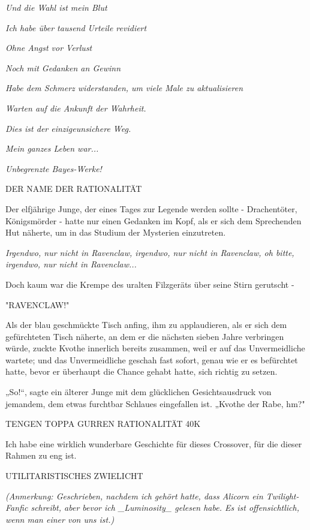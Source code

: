 {\emph{\emph{Und} \emph{die} \emph{Wahl ist mein Blut}}

\emph{\emph{Ich habe über tausend Urteile revidiert}}

\emph{\emph{Ohne Angst vor Verlust}}

\emph{\emph{Noch} \emph{mit Gedanken an} \emph{Gewinn}}

\emph{\emph{Habe dem Schmerz widerstanden, um viele Male zu aktualisieren}}

\emph{\emph{Warten auf die Ankunft der Wahrheit.}}

\emph{\emph{Dies ist der einzigeunsichere Weg.}}

\emph{\emph{Mein ganzes Leben war...}}

\emph{\emph{Unbegrenzte Bayes-Werke!}}

DER NAME DER RATIONALITÄT

Der elfjährige Junge, der eines Tages zur Legende werden sollte - Drachentöter, Königsmörder - hatte nur einen Gedanken im Kopf, als er sich dem Sprechenden Hut näherte, um in das Studium der Mysterien einzutreten.

\emph{\emph{Irgendwo, nur nicht in Ravenclaw, irgendwo, nur nicht in Ravenclaw, oh bitte, irgendwo, nur nicht in Ravenclaw...}}

Doch kaum war die Krempe des uralten Filzgeräts über seine Stirn gerutscht -

"RAVENCLAW!"

Als der blau geschmückte Tisch anfing, ihm zu applaudieren, als er sich dem gefürchteten Tisch näherte, an dem er die nächsten sieben Jahre verbringen würde, zuckte Kvothe innerlich bereits zusammen, weil er auf das Unvermeidliche wartete; und das Unvermeidliche geschah fast sofort, genau wie er es befürchtet hatte, bevor er überhaupt die Chance gehabt hatte, sich richtig zu setzen.

„So!“, sagte ein älterer Junge mit dem glücklichen Gesichtsausdruck von jemandem, dem etwas furchtbar Schlaues eingefallen ist. „Kvothe der Rabe, hm?"

TENGEN TOPPA GURREN RATIONALITÄT 40K

Ich habe eine wirklich wunderbare Geschichte für dieses Crossover, für die dieser Rahmen zu eng ist.

UTILITARISTISCHES ZWIELICHT

\emph{\emph{(Anmerkung: Geschrieben, nachdem ich gehört hatte, dass} \emph{Alicorn} \emph{ein Twilight-Fanfic} \emph{schreibt, aber bevor ich \_Luminosity\_ gelesen habe. Es ist offensichtlich, wenn man einer von uns ist.)}}

}
